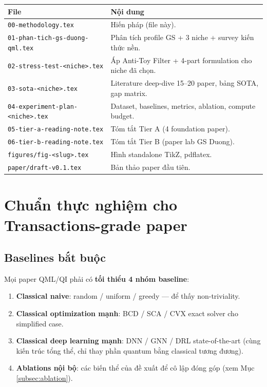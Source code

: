 \documentclass[11pt,a4paper]{article}
\begin{document}
\begin{longtable}{@{}p{5.5cm} p{9.5cm}@{}}
\toprule
\textbf{File} & \textbf{Nội dung} \\
\midrule
\endhead
\texttt{00-methodology.tex} & Hiến pháp (file này). \\
\texttt{01-phan-tich-gs-duong-qml.tex} & Phân tích profile GS + 3 niche + survey kiến thức nền. \\
\texttt{02-stress-test-<niche>.tex} & Áp Anti-Toy Filter + 4-part formulation cho niche đã chọn. \\
\texttt{03-sota-<niche>.tex} & Literature deep-dive 15--20 paper, bảng SOTA, gap matrix. \\
\texttt{04-experiment-plan-<niche>.tex} & Dataset, baselines, metrics, ablation, compute budget. \\
\texttt{05-tier-a-reading-note.tex} & Tóm tắt Tier A (4 foundation paper). \\
\texttt{06-tier-b-reading-note.tex} & Tóm tắt Tier B (paper lab GS Duong). \\
\texttt{figures/fig-<slug>.tex} & Hình standalone TikZ, pdflatex. \\
\texttt{paper/draft-v0.1.tex} & Bản thảo paper đầu tiên. \\
\bottomrule
\end{longtable}

\section{Chuẩn thực nghiệm cho Transactions-grade paper}

\subsection{Baselines bắt buộc}

Mọi paper QML/QI phải có \textbf{tối thiểu 4 nhóm baseline}:

\begin{enumerate}
  \item \textbf{Classical naive}: random / uniform / greedy --- để thấy non-triviality.
  \item \textbf{Classical optimization mạnh}: BCD / SCA / CVX exact solver cho simplified case.
  \item \textbf{Classical deep learning mạnh}: DNN / GNN / DRL state-of-the-art (cùng kiến trúc tổng thể, chỉ thay phần quantum bằng classical tương đương).
  \item \textbf{Ablations nội bộ}: các biến thể của đề xuất để cô lập đóng góp (xem Mục \ref{subsec:ablation}).
\end{enumerate}
\end{document}

